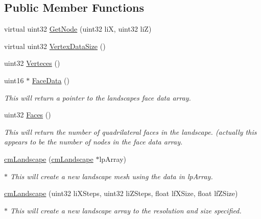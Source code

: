\subsection*{Public Member Functions}
\begin{DoxyCompactItemize}
\item 
virtual uint32 \hyperlink{classcm_landscape_a3b2b67f26668d3f7424cb69faf733b30}{GetNode} (uint32 liX, uint32 liZ)
\item 
virtual uint32 \hyperlink{classcm_landscape_abcc71bb395322f17295d41ee6a0cf8fd}{VertexDataSize} ()
\item 
uint32 \hyperlink{classcm_landscape_af0e382de031fb0d6c9a2a721ac2387ef}{Verteces} ()
\item 
uint16 $\ast$ \hyperlink{classcm_landscape_a559d50ea2cd594a12b87f556990043df}{FaceData} ()
\begin{DoxyCompactList}\small\item\em This will return a pointer to the landscapes face data array. \item\end{DoxyCompactList}\item 
uint32 \hyperlink{classcm_landscape_adb8e0e4968124d0ddae602ab5a51c147}{Faces} ()
\begin{DoxyCompactList}\small\item\em This will return the number of quadrilateral faces in the landscape. (actually this appears to be the number of nodes in the face data array. \item\end{DoxyCompactList}\item 
\hyperlink{classcm_landscape_aa1df1ae24ed2c5bb8616f21eeee3d036}{cmLandscape} (\hyperlink{classcm_landscape}{cmLandscape} $\ast$lpArray)
\begin{DoxyCompactList}\small\item\em $\ast$ This will create a new landscape mesh using the data in lpArray. \item\end{DoxyCompactList}\item 
\hyperlink{classcm_landscape_ae3c071c7ee84599c0fa47eba90290615}{cmLandscape} (uint32 liXSteps, uint32 liZSteps, float lfXSize, float lfZSize)
\begin{DoxyCompactList}\small\item\em $\ast$ This will create a new landscape array to the resolution and size specified. \item\end{DoxyCompactList}\item 

\end{DoxyCompactItemize}
